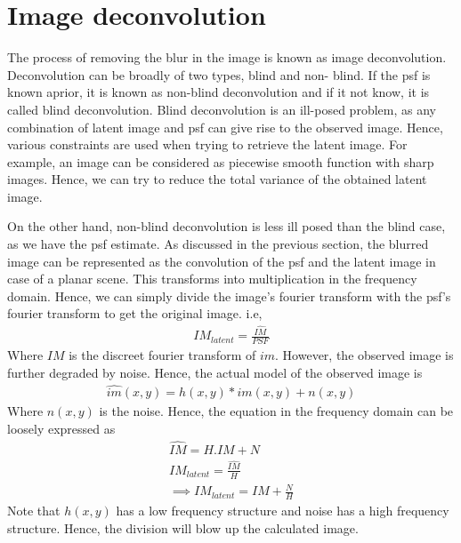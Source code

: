 \documentclass[BTech]{iitmdiss}
\begin{document}
\section{Image deconvolution}
\label{basic_theory:deconv}
The process of removing the blur in the image is known as image
deconvolution. Deconvolution can be broadly of two types, blind and non-
blind. If the psf is known aprior, it is known as non-blind 
deconvolution and if it not know, it is called blind deconvolution. 
Blind deconvolution is an ill-posed problem, as any combination of 
latent image and psf can give rise to the observed image. Hence, various
constraints are used when trying to retrieve the latent image. For 
example, an image can be considered as piecewise smooth function with
sharp images. Hence, we can try to reduce the total variance of the 
obtained latent image. %

On the other hand, non-blind deconvolution is less ill posed than the
blind case, as we have the psf estimate. As discussed in the previous 
section, the blurred image can be represented as the convolution of 
the psf and the latent image in case of a planar scene. This 
transforms into multiplication in the frequency domain. Hence, we can
simply divide the image's fourier transform with the psf's fourier
transform to get the original image. i.e,
\begin{align*}
IM_{latent} = \frac{\hat{IM}}{PSF}
\end{align*}
Where $IM$ is the discreet fourier transform of $im$. However, the 
observed image is further degraded by noise. Hence, the actual model of
the observed image is
\begin{align*}
\hat{im}(x,y) = h(x,y)*im(x,y) + n(x,y) 
\end{align*}
Where $n(x,y)$ is the noise. Hence, the equation in the frequency domain
can be loosely expressed as
\begin{align*}
\hat{IM} = H.IM + N\\
IM_{latent} = \frac{\hat{IM}}{H}\\
\implies IM_{latent} = IM + \frac{N}{H}
\end{align*}
Note that $h(x,y)$ has a low frequency structure and noise has a high 
frequency structure. Hence, the division will blow up the calculated 
image. 
\end{document}
